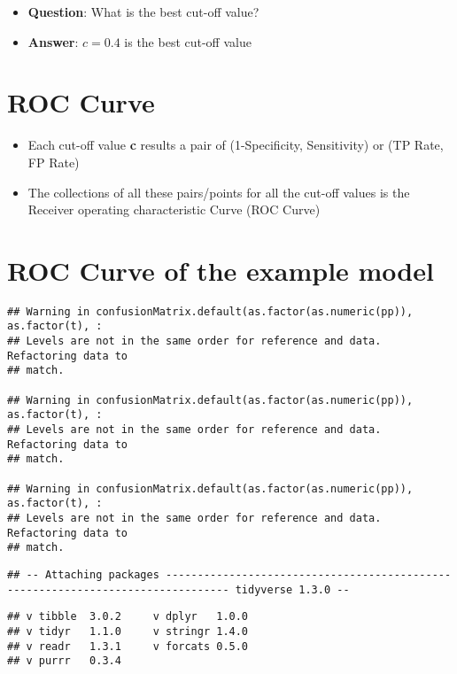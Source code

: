 \documentclass[
]{article}
\providecommand{\tightlist}{%
  \setlength{\itemsep}{0pt}\setlength{\parskip}{0pt}}
\begin{document}
\begin{itemize}
\tightlist
\item
  \textbf{Question}: What is the best cut-off value?
\item
  \textbf{Answer}: \(c = 0.4\) is the best cut-off value
\end{itemize}

\hypertarget{roc-curve-1}{%
\section{ROC Curve}\label{roc-curve-1}}

\begin{itemize}
\tightlist
\item
  Each cut-off value \textbf{c} results a pair of (1-Specificity,
  Sensitivity) or (TP Rate, FP Rate)
\item
  The collections of all these pairs/points for all the cut-off values
  is the Receiver operating characteristic Curve (ROC Curve)
\end{itemize}

\hypertarget{roc-curve-of-the-example-model}{%
\section{ROC Curve of the example
model}\label{roc-curve-of-the-example-model}}

\begin{verbatim}
## Warning in confusionMatrix.default(as.factor(as.numeric(pp)), as.factor(t), :
## Levels are not in the same order for reference and data. Refactoring data to
## match.

## Warning in confusionMatrix.default(as.factor(as.numeric(pp)), as.factor(t), :
## Levels are not in the same order for reference and data. Refactoring data to
## match.

## Warning in confusionMatrix.default(as.factor(as.numeric(pp)), as.factor(t), :
## Levels are not in the same order for reference and data. Refactoring data to
## match.
\end{verbatim}

\begin{verbatim}
## -- Attaching packages -------------------------------------------------------------------------------- tidyverse 1.3.0 --
\end{verbatim}

\begin{verbatim}
## v tibble  3.0.2     v dplyr   1.0.0
## v tidyr   1.1.0     v stringr 1.4.0
## v readr   1.3.1     v forcats 0.5.0
## v purrr   0.3.4
\end{verbatim}
\end{document}
